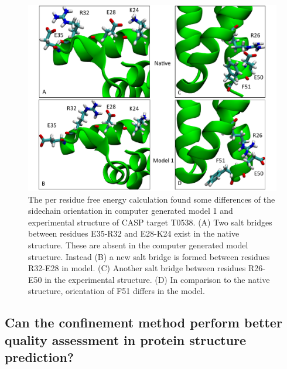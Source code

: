 \documentclass[12pt]{article}
\begin{document}
\begin{figure}
\begin{center}
\includegraphics[width=4.9 in,height=4.0 in]{Target_538_compare.pdf}
\end{center}
\caption{The per residue free energy calculation found some differences of the sidechain orientation in computer generated model 1 and 
experimental structure of CASP target T0538. 
(A) Two salt bridges between residues E35-R32 and E28-K24 exist in the native structure. These are
absent in the computer generated model structure. Instead
(B) a new salt bridge is formed between residues R32-E28 in model. (C) Another salt bridge between
residues  R26-E50 in the experimental structure. (D) In comparison to the native 
structure, orientation of F51 differs in the model.}
\label{fig:T0538compare}
\end{figure}


\subsection*{Can the confinement method perform better quality assessment in protein structure prediction?}
\end{document}
